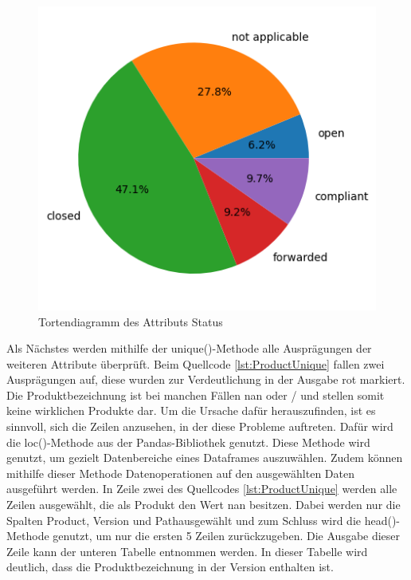 \begin{figure}[H]
    \centering
    \includegraphics[width = \textwidth/2]{abbildungen/Status.png}
    \caption{Tortendiagramm des Attributs Status}
    \label{fig:StatusPie}
\end{figure}

Als Nächstes werden mithilfe der unique()-Methode alle Ausprägungen der weiteren Attribute überprüft. Beim Quellcode \ref*{lst:ProductUnique} fallen zwei Ausprägungen
auf, diese wurden zur Verdeutlichung in der Ausgabe rot markiert. Die Produktbezeichnung ist bei manchen Fällen \glqq nan\grqq{} oder \glqq /\grqq{} und stellen somit
keine wirklichen Produkte dar. Um die Ursache dafür herauszufinden, ist es sinnvoll, sich die Zeilen anzusehen, in der diese Probleme auftreten. Dafür wird die
loc()-Methode aus der Pandas-Bibliothek genutzt. Diese Methode wird genutzt, um gezielt Datenbereiche eines Dataframes auszuwählen. Zudem können mithilfe dieser Methode
Datenoperationen auf den ausgewählten Daten ausgeführt werden. In Zeile zwei des Quellcodes \ref*{lst:ProductUnique} werden alle Zeilen ausgewählt, die als Produkt
den Wert \glqq nan\grqq{} besitzen. Dabei werden nur die Spalten \glqq Product\grqq{}, \glqq Version\grqq{} und \glqq Path\grqq ausgewählt und zum Schluss
wird die head()-Methode genutzt, um nur die ersten 5 Zeilen zurückzugeben. Die Ausgabe dieser Zeile kann der unteren Tabelle entnommen werden.
In dieser Tabelle wird deutlich, dass die Produktbezeichnung in der Version enthalten ist. 

